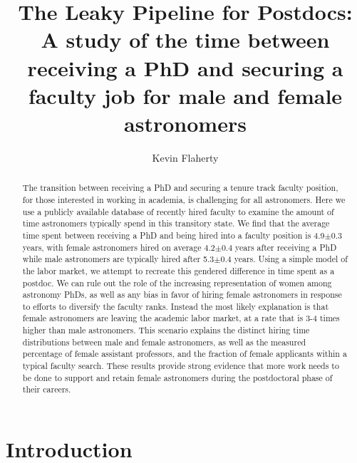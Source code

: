 \documentclass[modern]{aastex62}
\begin{document}
\title{The Leaky Pipeline for Postdocs: A study of the time between receiving a PhD and securing a faculty job for male and female astronomers}

\author[0000-0003-2657-1314]{Kevin Flaherty}

\begin{abstract}
The transition between receiving a PhD and securing a tenure track faculty position, for those interested in working in academia, is challenging for all astronomers. Here we use a publicly available database of recently hired faculty to examine the amount of time astronomers typically spend in this transitory state. We find that the average time spent between receiving a PhD and being hired into a faculty position is 4.9$\pm$0.3 years, with female astronomers hired on average 4.2$\pm$0.4 years after receiving a PhD while male astronomers are typically hired after 5.3$\pm$0.4 years. Using a simple model of the labor market, we attempt to recreate this gendered difference in time spent as a postdoc. We can rule out the role of the increasing representation of women among astronomy PhDs, as well as any bias in favor of hiring female astronomers in response to efforts to diversify the faculty ranks. Instead the most likely explanation is that female astronomers are leaving the academic labor market, at a rate that is 3-4 times higher than male astronomers. This scenario explains the distinct hiring time distributions between male and female astronomers, as well as the measured percentage of female assistant professors, and the fraction of female applicants within a typical faculty search. These results provide strong evidence that more work needs to be done to support and retain female astronomers during the postdoctoral phase of their careers. 
\end{abstract}


\section{Introduction}
\end{document}
